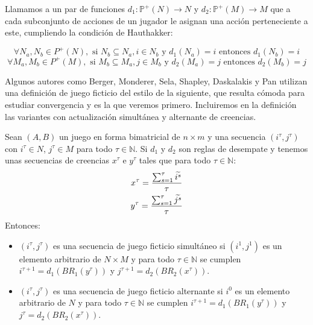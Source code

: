 \begin{definition} \label{def:reglas:desempate}
    Llamamos  a un par de funciones $d_1: \mathbb{P}^+(N) \rightarrow N$ y $d_2: \mathbb{P}^+(M) \rightarrow M$ que a cada subconjunto de acciones de un jugador le asignan una acción perteneciente a este, cumpliendo la condición de Hauthakker:

    \[
        \forall N_a, N_b \in {P}^+(N), \text{ si } N_b \subseteq N_a, i \in N_b \text{ y } d_1(N_a) = i  \text{ entonces } d_1(N_b) = i
    \]
    \[
        \forall M_a, M_b \in {P}^+(M), \text{ si } M_b \subseteq M_a, j \in M_b \text{ y } d_2(M_a) = j  \text{ entonces } d_2(M_b) = j
    \]
\end{definition}

Algunos autores como Berger, Monderer, Sela, Shapley, Daskalakis y Pan \cite{browns:original} \cite{no:cycling} \cite{2x2:without} \cite{identical:interests} \cite{counter:karlin:strong} utilizan una definición de juego ficticio del estilo de la siguiente, que resulta cómoda para estudiar convergencia y es la que veremos primero. Incluiremos en la definición las variantes con actualización simultánea y alternante de creencias.

\begin{definition} \label{def:fp:berger}
    Sean $(A, B)$ un juego en forma bimatricial de $n \times m$ y una secuencia $(i^\tau, j^\tau)$ con $i^\tau \in N$, $j^\tau \in M$ para todo $\tau \in \mathbb{N}$. Si $d_1$ y $d_2$ son reglas de desempate y tenemos unas secuencias de creencias $x^\tau$ e $y^\tau$ tales que para todo $\tau \in \mathbb{N}$:
    \begin{gather*}
        x^\tau= \frac{\sum^\tau_{s=1} \widetilde{i^s}}{\tau}  \\
        y^\tau= \frac{\sum^\tau_{s=1} \widetilde{j^s}}{\tau}
    \end{gather*}
    Entonces:
    \begin{itemize}
        \item $(i^\tau, j^\tau)$ es una secuencia de juego ficticio simultáneo si $(i^1, j^1)$ es un elemento arbitrario de $N \times M$ y para todo $\tau \in \mathbb{N}$ se cumplen $i^{\tau+1} = d_1(BR_1(y^\tau))$ y $j^{\tau+1} = d_2(BR_2(x^\tau))$.
        \item $(i^\tau, j^\tau)$ es una secuencia de juego ficticio alternante si $i^0$ es un elemento arbitrario de $N$ y para todo $\tau \in \mathbb{N}$ se cumplen $i^{\tau+1} = d_1(BR_1(y^\tau))$ y $j^{\tau} = d_2(BR_2(x^\tau))$.
    \end{itemize}
\end{definition}

